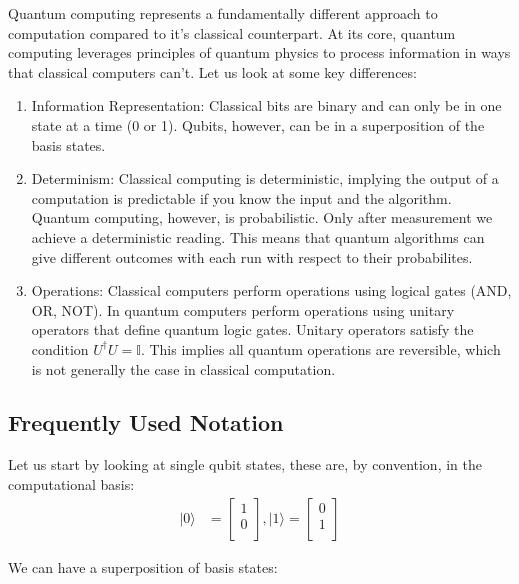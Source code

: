 \documentclass[msc,oneside]{ubcthesis}
\begin{document}
	Quantum computing represents a fundamentally different approach to computation compared to  it's classical counterpart. At its core, quantum computing leverages principles of quantum physics to process information in ways that classical computers can't. Let us look at some key differences:
	\begin{enumerate}
		\item 	Information Representation: Classical bits are binary and can only be in one state at a time (0 or 1). Qubits, however, can be in a superposition of the basis states.

		\item 	Determinism: Classical computing is deterministic, implying the output of a computation is predictable if you know the input and the algorithm. Quantum computing, however, is probabilistic. Only after measurement we achieve a deterministic reading. This means that quantum algorithms can give different outcomes with each run with respect to their probabilites.
		
		\item Operations: Classical computers perform operations using logical gates (AND, OR, NOT). In quantum computers perform operations using unitary operators that define quantum logic gates. Unitary operators satisfy the condition $U^{\dagger}U = \mathbb{I}$. This implies all quantum operations are reversible, which is not generally the case in classical computation.
		
	\end{enumerate}
	
	
	\subsection{Frequently Used Notation}
	
	Let us start by looking at single qubit states, these are, by convention, in the computational basis: 
	\begin{align*}	
		|0\rangle &= \begin{bmatrix}
			1 \\
			0 \\
		\end{bmatrix}, 
		|1\rangle = \begin{bmatrix}
			0 \\
			1 \\
		\end{bmatrix}
	\end{align*}
	
	We can have a superposition of basis states:
	
\end{document}
